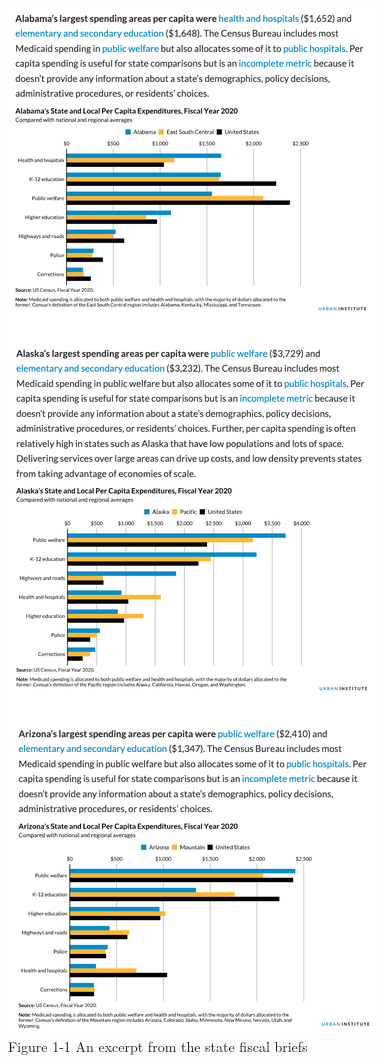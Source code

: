 \documentclass[
]{book}
\begin{document}
\begin{figure}
\includegraphics[width=1\linewidth]{assets/state-fiscal-briefs} \caption{Figure 1-1 An excerpt from the state fiscal briefs}\label{fig:state-fiscal-briefs}
\end{figure}
\end{document}
